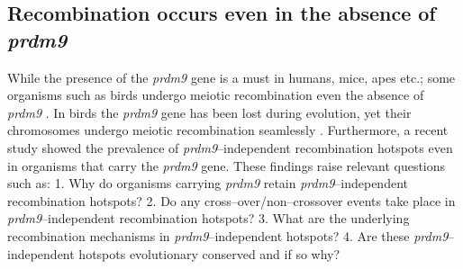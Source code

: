 \documentclass[12pt,a4paper]{article}
\begin{document}
\subsection{Recombination occurs even in the absence of \textit{prdm9}}
While the presence of the \textit{prdm9} gene is a must in humans, mice, apes etc.; some organisms such as birds undergo meiotic recombination even the absence of \textit{prdm9} \parencite{cavassim_prdm9_2022, pigozzi_chromosomes_2016}. In birds the \textit{prdm9} gene has been lost during evolution, yet their chromosomes undergo meiotic recombination seamlessly \parencite{pigozzi_chromosomes_2016}. Furthermore, a recent study \parencite{joseph_high_2024} showed the prevalence of \textit{prdm9}--independent recombination hotspots even in organisms that carry the \textit{prdm9} gene. These findings raise relevant questions such as: 1. Why do organisms carrying \textit{prdm9} retain \textit{prdm9}--independent recombination hotspots? 2. Do any cross--over/non--crossover events take place in \textit{prdm9}--independent recombination hotspots? 3. What are the underlying recombination mechanisms in \textit{prdm9}--independent hotspots?
4. Are these \textit{prdm9}--independent hotspots evolutionary conserved and if so why?
\end{document}
